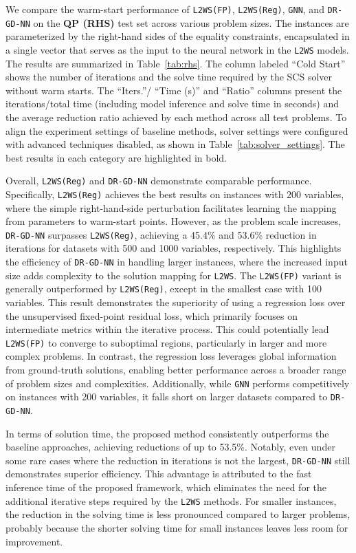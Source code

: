 \documentclass[10pt]{article} %
\begin{document}
We compare the warm-start performance of \texttt{L2WS(FP)}, \texttt{L2WS(Reg)}, \texttt{GNN}, and \texttt{DR-GD-NN} on the \textbf{QP (RHS)} test set across various problem sizes.
The instances are parameterized by the right-hand sides of the equality constraints, encapsulated in a single vector that serves as the input to the neural network in the \texttt{L2WS} models.
The results are summarized in Table~\ref{tab:rhs}.
The column labeled \enquote{Cold Start} shows the number of iterations and the solve time required by the SCS solver without warm starts. 
The \enquote{Iters.}/ \enquote{Time (s)} and \enquote{Ratio} columns present the iterations/total time (including model inference and solve time in seconds) and the average reduction ratio achieved by each method across all test problems. 
To align the experiment settings of baseline methods, solver settings were configured with advanced techniques disabled, as shown in Table~\ref{tab:solver_settings}. 
The best results in each category are highlighted in bold.

Overall, \texttt{L2WS(Reg)} and \texttt{DR-GD-NN} demonstrate comparable performance. 
Specifically, \texttt{L2WS(Reg)} achieves the best results on instances with $200$ variables, where the simple right-hand-side perturbation facilitates learning the mapping from parameters to warm-start points.
However, as the problem scale increases, \texttt{DR-GD-NN} surpasses \texttt{L2WS(Reg)}, achieving a 45.4\% and 53.6\% reduction in iterations for datasets with 500 and 1000 variables, respectively. 
This highlights the efficiency of \texttt{DR-GD-NN} in handling larger instances, where the increased input size adds complexity to the solution mapping for \texttt{L2WS}. 
The \texttt{L2WS(FP)} variant is generally outperformed by \texttt{L2WS(Reg)}, except in the smallest case with 100 variables. 
This result demonstrates the superiority of using a regression loss over the unsupervised fixed-point residual loss, which primarily focuses on intermediate metrics within the iterative process. 
This could potentially lead \texttt{L2WS(FP)} to converge to suboptimal regions, particularly in larger and more complex problems.
In contrast, the regression loss leverages global information from ground-truth solutions, enabling better performance across a broader range of problem sizes and complexities. 
Additionally, while \texttt{GNN} performs competitively on instances with 200 variables, it falls short on larger datasets compared to \texttt{DR-GD-NN}.


In terms of solution time, the proposed method consistently outperforms the baseline approaches, achieving reductions of up to 53.5\%. 
Notably, even under some rare cases where the reduction in iterations is not the largest, \texttt{DR-GD-NN} still demonstrates superior efficiency.
This advantage is attributed to the fast inference time of the proposed framework, which eliminates the need for the additional iterative steps required by the \texttt{L2WS} methods.
For smaller instances, the reduction in the solving time is less pronounced compared to larger problems, probably because the shorter solving time for small instances leaves less room for improvement. 
\end{document}
